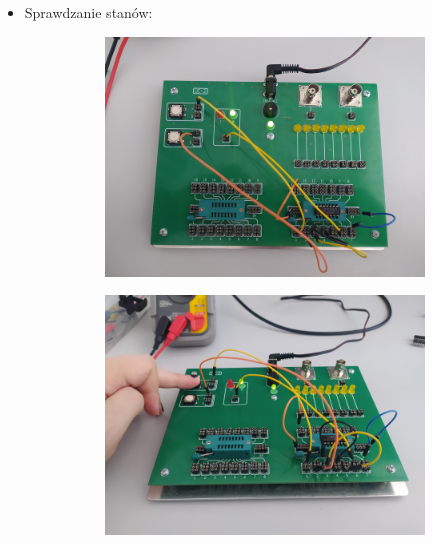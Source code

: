 \begin{itemize}
            \item Sprawdzanie stanów:
                \begin{figure}[H]
                    \centering
                        \begin{subfigure}[h]{0.4\textwidth}
                            \includegraphics[width=\textwidth]{img/NAND/funkcje/1652306732595_scaled.png}
                        \end{subfigure}
                        \begin{subfigure}[h]{0.4\textwidth}
                            \includegraphics[width=\textwidth]{img/NAND/funkcje/1652306732585_scaled.png}
                        \end{subfigure}

\end{figure}
\end{itemize}
